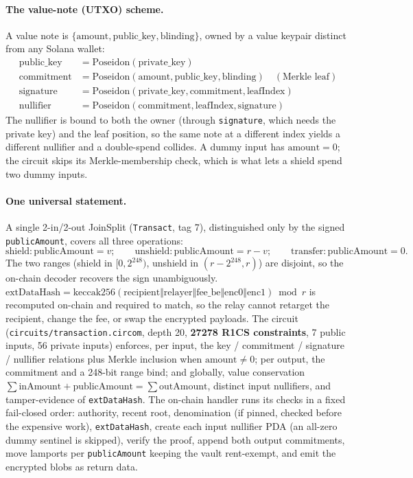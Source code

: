 \documentclass[10pt]{article}
\newcommand{\code}[1]{\texttt{#1}}
\begin{document}
\paragraph{The value-note (UTXO) scheme.} A value note is
$\{\text{amount}, \text{public\_key}, \text{blinding}\}$, owned by a value keypair
distinct from any Solana wallet:
\begin{align*}
\text{public\_key} &= \text{Poseidon}(\text{private\_key}) \\
\text{commitment}  &= \text{Poseidon}(\text{amount}, \text{public\_key}, \text{blinding}) \quad(\text{Merkle leaf}) \\
\text{signature}   &= \text{Poseidon}(\text{private\_key}, \text{commitment}, \text{leafIndex}) \\
\text{nullifier}   &= \text{Poseidon}(\text{commitment}, \text{leafIndex}, \text{signature})
\end{align*}
The nullifier is bound to both the owner (through \code{signature}, which needs
the private key) and the leaf position, so the same note at a different index
yields a different nullifier and a double-spend collides. A dummy input has
$\text{amount}=0$; the circuit skips its Merkle-membership check, which is what
lets a shield spend two dummy inputs.

\paragraph{One universal statement.} A single 2-in/2-out JoinSplit
(\code{Transact}, tag 7), distinguished only by the signed \code{publicAmount},
covers all three operations:
\[
\text{shield}: \text{publicAmount}=v; \qquad
\text{unshield}: \text{publicAmount}=r-v; \qquad
\text{transfer}: \text{publicAmount}=0.
\]
The two ranges (shield in $[0,2^{248})$, unshield in $(r-2^{248}, r)$) are
disjoint, so the on-chain decoder recovers the sign unambiguously.
$\text{extDataHash} = \text{keccak256}(\text{recipient} \Vert \text{relayer}
\Vert \text{fee\_be} \Vert \text{enc0} \Vert \text{enc1}) \bmod r$ is recomputed
on-chain and required to match, so the relay cannot retarget the recipient, change
the fee, or swap the encrypted payloads. The circuit
(\code{circuits/transaction.circom}, depth 20, \textbf{27278 R1CS constraints},
7 public inputs, 56 private inputs) enforces, per input, the key / commitment /
signature / nullifier relations plus Merkle inclusion when $\text{amount}\neq0$;
per output, the commitment and a 248-bit range bind; and globally, value
conservation $\sum \text{inAmount} + \text{publicAmount} = \sum \text{outAmount}$,
distinct input nullifiers, and tamper-evidence of \code{extDataHash}. The
on-chain handler runs its checks in a fixed fail-closed order: authority, recent
root, denomination (if pinned, checked before the expensive work), \code{extDataHash},
create each input nullifier PDA (an all-zero dummy sentinel is skipped), verify
the proof, append both output commitments, move lamports per \code{publicAmount}
keeping the vault rent-exempt, and emit the encrypted blobs as return data.
\end{document}
